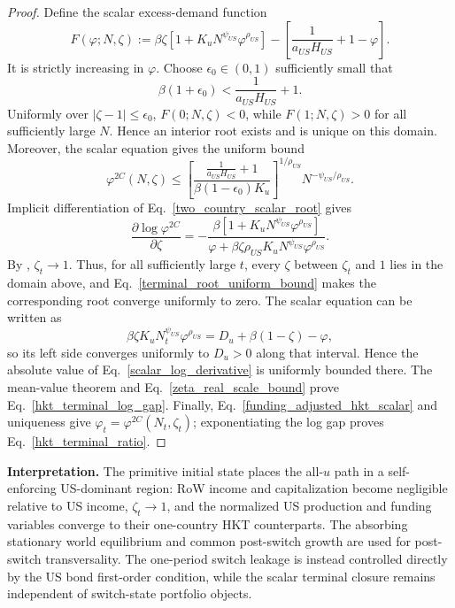\documentclass{article}
\def\green#1{#1}%
\begin{document}
\begin{proof}
\green{Define the scalar excess-demand function}
\[
F(\varphi;N,\zeta)
:\green{=}
\green{\beta\zeta}[\green{1+K}_\green{uN}^{\green{\psi}_{\green{US}}}\green{\varphi}^{\green{\rho}_{\green{US}}}]
\green{-}\left[\frac{\green{1}}{\green{a}_{\green{US}}\green{H}_{\green{US}}}\green{+1-\varphi}\right].
\]
\green{It} is strictly increasing in $\varphi$.  Choose $\epsilon_0\in(0,1)$ sufficiently small that
\[
\beta(1+\epsilon_0)<\frac{1}{a_{US}H_{US}}+1.
\]
Uniformly over $|\zeta-1|\le\epsilon_0$, $F(0;N,\zeta)<0$, while $F(1;N,\zeta)>0$ for all sufficiently large $N$.  Hence an interior root exists and is unique on this domain.  Moreover, the scalar equation gives the uniform bound
\begin{equation}\label{terminal_root_uniform_bound}
\varphi^{2C}(N,\zeta)
\le
\left[
\frac{\frac{1}{a_{US}H_{US}}+1}
{\beta(1-\epsilon_0)K_u}
\right]^{1/\rho_{US}}
N^{-\psi_{US}/\rho_{US}}.
\end{equation}
Implicit differentiation of Eq.~\eqref{two_country_scalar_root} gives
\begin{equation}\label{scalar_log_derivative}
\frac{\partial\log\varphi^{2C}}{\partial\zeta}
=
-\frac{
\beta[1+K_uN^{\psi_{US}}\varphi^{\rho_{US}}]
}{
\varphi+\beta\zeta\rho_{US}K_uN^{\psi_{US}}\varphi^{\rho_{US}}
}.
\end{equation}
By , $\zeta_t\to1$.  Thus, for all sufficiently large $t$, every $\zeta$ between $\zeta_t$ and $1$ lies in the domain above, and Eq.~\eqref{terminal_root_uniform_bound} makes the corresponding root converge uniformly to zero.  The scalar equation can be written as
\[
\beta\zeta K_uN_t^{\psi_{US}}\varphi^{\rho_{US}}
=D_u+\beta(1-\zeta)-\varphi,
\]
so its left side converges uniformly to $D_u>0$ along that interval.  Hence the absolute value of Eq.~\eqref{scalar_log_derivative} is uniformly bounded there.  The mean-value theorem and Eq.~\eqref{zeta_real_scale_bound} prove Eq.~\eqref{hkt_terminal_log_gap}.  Finally, Eq.~\eqref{funding_adjusted_hkt_scalar} and uniqueness give $\varphi_t=\varphi^{2C}(N_t,\zeta_t)$; exponentiating the log gap proves Eq.~\eqref{hkt_terminal_ratio}.
\end{proof}

\noindent
\textbf{Interpretation.}
The \green{primitive initial state places the} all-$u$ \green{path in} a self-enforcing \green{US-dominant} region: RoW income and capitalization become negligible relative to US income, $\zeta_t\to1$, and the normalized US production and funding variables converge to their one-country HKT counterparts.  The absorbing stationary world equilibrium and common post-switch growth \green{are used for post-switch transversality}.  \green{The one-period switch leakage is instead controlled directly by} the \green{US bond first-order condition}, \green{while} the scalar terminal closure \green{remains independent of switch-state portfolio objects}.


\appendix


\end{document}
